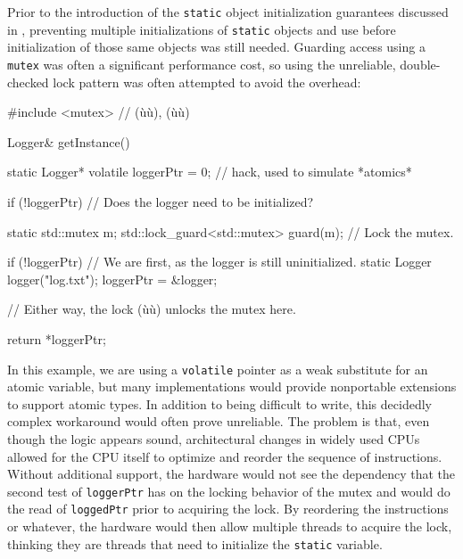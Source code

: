 Prior to the introduction of the  \lstinline!static!
object initialization guarantees discussed in , preventing multiple initializations of \lstinline!static! objects
and use before initialization of those same objects was still needed.
Guarding access using a \lstinline!mutex! was often a significant performance cost, so
using the unreliable, double-checked lock pattern was often attempted to
avoid the overhead:

\begin{emcppshiddenlisting}[emcppsbatch=e16]
#include <mutex>  // (ù{}ù), (ù{}ù)
\end{emcppshiddenlisting}
\begin{emcppslisting}[emcppsbatch=e16]
Logger& getInstance()
{
    static Logger* volatile loggerPtr = 0;  // hack, used to simulate *atomics*

    if (!loggerPtr)  // Does the logger need to be initialized?
    {
        static std::mutex m;
        std::lock_guard<std::mutex> guard(m);  // Lock the mutex.

        if (!loggerPtr)  // We are first, as the logger is still uninitialized.
        {
            static Logger logger("log.txt");
            loggerPtr = &logger;
        }
    }                    // Either way, the lock (ù{}ù) unlocks the mutex here.

    return *loggerPtr;
}
\end{emcppslisting}

\noindent In this example, we are using a \lstinline!volatile! pointer as a weak
substitute for an atomic variable, but many implementations would
provide nonportable extensions to support atomic types. In addition to
being difficult to write, this decidedly complex workaround would often
prove unreliable. The problem is that, even though the logic appears
sound, architectural changes in widely used CPUs allowed for the CPU
itself to optimize and reorder the sequence of instructions. Without
additional support, the hardware would not see the dependency that the
second test of \lstinline!loggerPtr! has on the locking behavior of the
mutex and would do the read of \lstinline!loggedPtr! prior to acquiring the
lock. By reordering the instructions or whatever, the hardware
would then allow multiple threads to acquire the lock, thinking they are
threads that need to initialize the \lstinline!static! variable.


